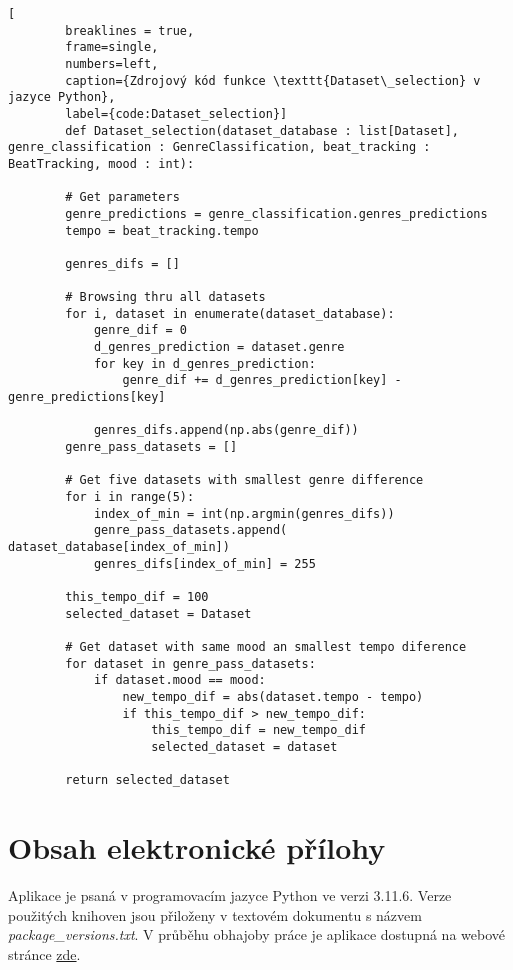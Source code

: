 \begin{minipage}{\linewidth}
	\begin{lstlisting}[
		breaklines = true,
		frame=single,
		numbers=left,
		caption={Zdrojový kód funkce \texttt{Dataset\_selection} v jazyce Python},
		label={code:Dataset_selection}]
		def Dataset_selection(dataset_database : list[Dataset], genre_classification : GenreClassification, beat_tracking : BeatTracking, mood : int):

		# Get parameters 
		genre_predictions = genre_classification.genres_predictions
		tempo = beat_tracking.tempo
	
		genres_difs = []
	
		# Browsing thru all datasets
		for i, dataset in enumerate(dataset_database):
			genre_dif = 0
			d_genres_prediction = dataset.genre
			for key in d_genres_prediction:
				genre_dif += d_genres_prediction[key] - genre_predictions[key]
	
			genres_difs.append(np.abs(genre_dif))
		genre_pass_datasets = []
	
		# Get five datasets with smallest genre difference
		for i in range(5):
			index_of_min = int(np.argmin(genres_difs))
			genre_pass_datasets.append( dataset_database[index_of_min])
			genres_difs[index_of_min] = 255
	
		this_tempo_dif = 100
		selected_dataset = Dataset
		
		# Get dataset with same mood an smallest tempo diference
		for dataset in genre_pass_datasets:
			if dataset.mood == mood:
				new_tempo_dif = abs(dataset.tempo - tempo)
				if this_tempo_dif > new_tempo_dif:
					this_tempo_dif = new_tempo_dif
					selected_dataset = dataset
	
		return selected_dataset
	\end{lstlisting}
\end{minipage}

\chapter{Obsah elektronické přílohy} \label{sec:Obsah_prilohy}
Aplikace je psaná v programovacím jazyce Python ve verzi 3.11.6. Verze použitých knihoven jsou přiloženy v textovém dokumentu s názvem \textit{package\_versions.txt}. V průběhu obhajoby práce je aplikace dostupná na webové stránce \href{http://vikinn.pythonanywhere.com/}{zde}.

